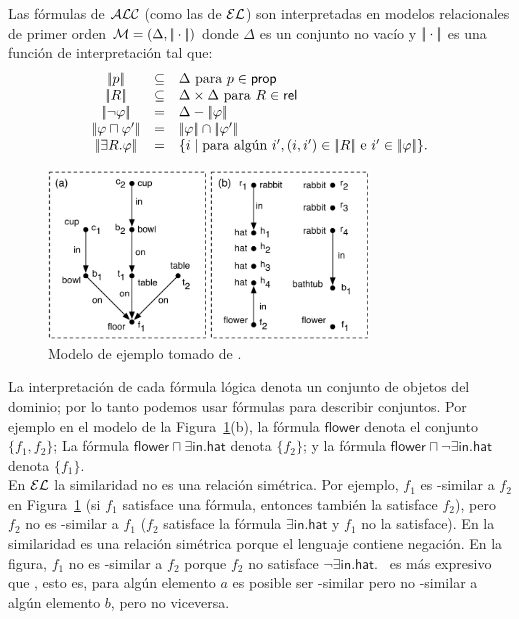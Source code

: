 Las f\'ormulas de $\mathcal{ALC}$ (como las de $\mathcal{EL}$) son interpretadas en modelos relacionales de primer orden $\mathcal{M} = (\Delta,|\!|\cdot|\!|)$ donde
$\Delta$ es un conjunto no vac\'io y $|\!|\cdot|\!|$ es una funci\'on de interpretaci\'on tal que:
$$
\begin{array}{ccl}
\interp{p} & \subseteq & \Delta  \mbox{ para $p \in \prop$}\\
\interp{R} & \subseteq & \Delta \times \Delta  \mbox{ para $R \in \rel$}\\
\interp{\neg \varphi} & = & \Delta - \interp{\varphi}\\
\interp{\varphi \sqcap \varphi'} & = & \interp{\varphi} \cap \interp{\varphi'}\\
\interp{\exists R.\varphi} & = & \{i \mid \mbox{para alg\'un } i', (i,i') \in \interp{R} \mbox{ e } i' \in \interp{\varphi} \}.\\
\end{array}
$$

\begin{figure}[t]
\begin{center}
\includegraphics[width=8.5cm]{pic-dale-haddock.pdf}
\caption{Modelo de ejemplo tomado de \protect\cite{dale91:gener}.}
\label{fig:dale-haddock}
\end{center}
\end{figure}


La interpretaci\'on de cada f\'ormula l\'ogica denota un conjunto de objetos del dominio; por lo tanto podemos usar f\'ormulas para describir conjuntos. 
Por ejemplo en el modelo de la Figura~\ref{fig:dale-haddock}(b), la f\'ormula
$\mathsf{flower}$ denota el conjunto $\{f_1,f_2\}$; La f\'ormula
$\mathsf{flower} \sqcap \exists \mathsf{in}.\mathsf{hat}$ denota
$\{f_2\}$; y la f\'ormula $\mathsf{flower} \sqcap \neg
\exists \mathsf{in}.\mathsf{hat}$ denota $\{f_1\}$.\\

En $\mathcal{EL}$ la similaridad no es una relaci\'on sim\'etrica. Por ejemplo, $f_1$ es \el-similar a $f_2$ en
Figura~\ref{fig:dale-haddock} (si $f_1$ satisface una f\'ormula, entonces tambi\'en la satisface $f_2$), pero $f_2$ no es \el-similar a $f_1$
($f_2$ satisface la f\'ormula $\exists \mathsf{in}.\mathsf{hat}$ y $f_1$
no la satisface). En \alc la similaridad es una relaci\'on sim\'etrica porque
el lenguaje contiene negaci\'on. En la figura, $f_1$ no es \alc-similar
a $f_2$ porque $f_2$ no satisface $\neg \exists
\mathsf{in}.\mathsf{hat}$. \alc\ es m\'as expresivo que \el,
esto es, para alg\'un elemento $a$ es posible ser \el-similar pero
no \alc-similar a alg\'un elemento $b$, pero no viceversa.

